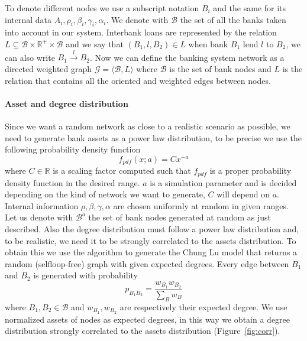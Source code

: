 \documentclass[a4paper, 11pt]{article}
\begin{document}
To denote different nodes we use a subscript notation $B_i$ and the same for its internal data $A_i,\rho_i,\beta_i,\gamma_i,\alpha_i$. We denote with $\mathcal{B}$ the set of all the banks taken into account in our system.
Interbank loans are represented by the relation $L \subseteq \mathcal{B} \times \mathbb{R^+} \times \mathcal{B}$ and we say that $(B_1,l,B_2) \in L$ when bank $B_1$ lend $l$ to $B_2$, we can also write $B_1 \xrightarrow{l} B_2$.
Now we can define the banking system network as a directed weighted graph $\mathcal{G} = \langle \mathcal{B}, L \rangle$ where $\mathcal{B}$ is the set of bank nodes and $L$ is the relation that contains all the oriented and weighted edges between nodes.

\paragraph{Asset and degree distribution} %
Since we want a random network as close to a realistic scenario as possible, we need to generate bank assets as a power law distribution, to be precise we use the following probability density function
$$ f_{pdf}(x;a) = C x^{-a} $$
where $C \in \mathbb{R}$ is a scaling factor computed such that $f_{pdf}$ is a proper probability density function in the desired range. $a$ is a simulation parameter and is decided depending on the kind of network we want to generate, $C$ will depend on $a$. Internal information $\rho,\beta,\gamma,\alpha$ are chosen uniformly at random in given ranges. Let us denote with $\mathcal{B}^a$ the set of bank nodes generated at random as just described. Also the degree distribution must follow a power law distribution and, to be realistic, we need it to be strongly correlated to the assets distribution. To obtain this we use the algorithm to generate the Chung Lu model \cite{ChungLu} that returns a random (selfloop-free) graph with given expected degrees. Every edge between $B_1$ and $B_2$ is generated with probability 
$$ p_{B_1B_2} = \frac{w_{B_1}w_{B_2}}{\sum_B w_B} $$
where $B_1,B_2 \in \mathcal{B}$ and $w_{B_1}, w_{B_2}$ are respectively their expected degree. We use normalized assets of nodes as expected degrees, in this way we obtain a degree distribution strongly correlated to the assets distribution (Figure~\ref{fig:corr}).
\end{document}
